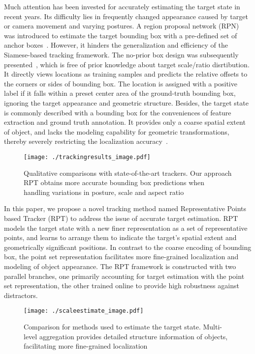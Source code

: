 \documentclass[runningheads]{llncs}
\begin{document}
Much attention has been invested for accurately estimating the target
state in recent years. Its difficulty lies in frequently changed
appearance caused by target or camera movement and varying postures. A
region proposal network (RPN) was introduced to estimate the target
bounding box with a pre-defined set of anchor boxes~\cite{siamrpn,siamrpn++,dasiamrpn}. However, it hinders
the generalization and efficiency of the Siamese-based tracking
framework. The no-prior box design was subsequently presented~\cite{siamfc++,siamban,siamcar}, which is free of prior
knowledge about target scale/ratio disrtibution. It
directly views locations as training samples and predicts the relative
offsets to the corners or sides of bounding box. The location is
assigned with a positive label if it falls within a preset center area
of the ground-truth bounding box, ignoring the target appearance and
geometric structure. Besides, the target state is commonly described
with a bounding box for the conveniences of feature extraction and
ground truth annotation. It provides only a coarse spatial
extent of object, and lacks the modeling capability for geometric
transformations, thereby severely restricting the localization accuracy~\cite{reppoints,densereppoints}.

\begin{figure}[t]
\centering
\texttt{[image: ./trackingresults\_image.pdf]}
\caption{Qualitative comparisons with state-of-the-art trackers. Our approach RPT obtains more accurate bounding box predictions when handling variations in posture, scale and aspect ratio}
\label{fig:trackingresults}
\end{figure}

In this paper, we propose a novel tracking method named Representative
Points based Tracker (RPT) to address the issue of accurate target
estimation. RPT models the target state with a new finer
representation as a set of representative points, and learns to arrange
them to indicate the target's spatial extent and geometrically
significant positions. In contrast to the coarse encoding of bounding
box, the point set representation facilitates more fine-grained
localization and modeling of object appearance. The RPT framework
is constructed with two parallel branches, one primarily
accounting for target estimation with the point set representation, the
other trained online to provide high robustness against distractors.

\begin{figure}[t]
\centering
\texttt{[image: ./scaleestimate\_image.pdf]}
\caption{Comparison for methods used to estimate the target state. Multi-level aggregation provides detailed structure information of objects, facilitating more fine-grained localization}
\label{fig:target_estimate}
\end{figure}
\end{document}
